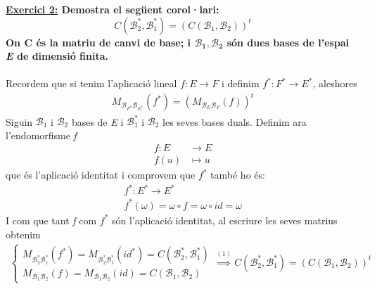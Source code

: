 \documentclass[a4paper, 11pt]{article}
\begin{document}
    \noindent\textbf{\large \underline{Exercici 2:} \normalsize Demostra el seg\"uent corol·lari:
    $$
        C(\mathcal{B}^*_2, \mathcal{B}^*_1) = \left( C(\mathcal{B}_1, \mathcal{B}_2) \right)^t
    $$
    On C \'es la matriu de canvi de base; i $\mathbf{\mathcal{B}_1, \mathcal{B}_2}$ s\'on dues bases de l'espai \emph{E} de dimensi\'o finita.
    }\\\\
    Recordem que si tenim l'aplicaci\'o lineal $f:E \longrightarrow F$ i definim $ f^*: F^* \longrightarrow E^* $, aleshores
    \begin{gather}
        M_{\mathcal{B}_{F^*}\mathcal{B}_{E^*}}(f^*) = \left( M_{\mathcal{B}_E\mathcal{B}_F}(f) \right)^t
    \end{gather}
    Siguin $ \mathcal{B}_1 $ i $ \mathcal{B}_2 $ bases de \emph{E} i $ \mathcal{B}^*_1 $ i $ \mathcal{B}_2 $ les seves bases duals. Definim ara l'endomorfisme \emph{f}
    \begin{align*}
        f: E &\longrightarrow E\\
        f(u) &\mapsto u
    \end{align*}
    que \'es l'aplicaci\'o identitat i comprovem que $ f^* $ tamb\'e ho \'es:
    \begin{gather*}
        f^*: E^* \longrightarrow E^*\\
        f^*(\omega) = \omega \circ f = \omega \circ id = \omega
    \end{gather*}
    I com que tant \emph{f} com $ f^* $ s\'on l'aplicaci\'o identitat, al escriure les seves matrius obtenim
    \begin{gather*}
        \begin{cases}
            M_{\mathcal{B}^*_2\mathcal{B}^*_1}(f^*) = M_{\mathcal{B}^*_2\mathcal{B}^*_1}(id^*) = C(\mathcal{B}^*_2, \mathcal{B}^*_1)\\
            M_{\mathcal{B}_1\mathcal{B}_2}(f) = M_{\mathcal{B}_1\mathcal{B}_2}(id) = C(\mathcal{B}_1, \mathcal{B}_2)
        \end{cases}
        \stackrel{(1)}{\implies} C(\mathcal{B}^*_2, \mathcal{B}^*_1) = \left( C(\mathcal{B}_1, \mathcal{B}_2) \right)^t
    \end{gather*}
    
\end{document}
